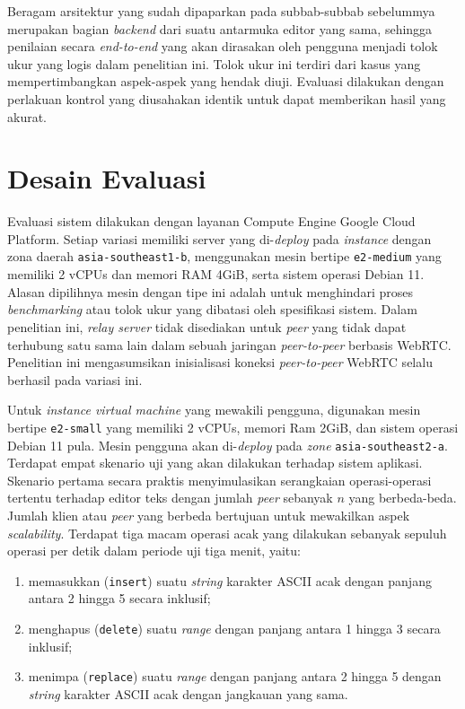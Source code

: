 Beragam arsitektur yang sudah dipaparkan pada subbab-subbab sebelummya merupakan bagian \textit{backend} dari suatu antarmuka editor yang sama, sehingga penilaian secara \textit{end-to-end} yang akan dirasakan oleh pengguna menjadi tolok ukur yang logis dalam penelitian ini. Tolok ukur ini terdiri dari kasus yang mempertimbangkan aspek-aspek yang hendak diuji. Evaluasi dilakukan dengan perlakuan kontrol yang diusahakan identik untuk dapat memberikan hasil yang akurat.

\section{Desain Evaluasi}
\label{sec:desain_evaluasi}

Evaluasi sistem dilakukan dengan layanan Compute Engine Google Cloud Platform. Setiap variasi memiliki server yang di-\textit{deploy} pada \textit{instance} dengan zona daerah \texttt{asia-southeast1-b}, menggunakan mesin bertipe \texttt{e2-medium} yang memiliki 2 vCPUs dan memori RAM 4GiB, serta sistem operasi Debian 11. Alasan dipilihnya mesin dengan tipe ini adalah untuk menghindari proses \textit{benchmarking} atau tolok ukur yang dibatasi oleh spesifikasi sistem. Dalam penelitian ini, \textit{relay server} tidak disediakan untuk \textit{peer} yang tidak dapat terhubung satu sama lain dalam sebuah jaringan \textit{peer-to-peer} berbasis WebRTC. Penelitian ini mengasumsikan inisialisasi koneksi \textit{peer-to-peer} WebRTC selalu berhasil pada variasi ini.

Untuk \textit{instance virtual machine} yang mewakili pengguna, digunakan mesin bertipe \texttt{e2-small} yang memiliki 2 vCPUs, memori Ram 2GiB, dan sistem operasi Debian 11 pula. Mesin pengguna akan di-\textit{deploy} pada \textit{zone} \texttt{asia-southeast2-a}. Terdapat empat skenario uji yang akan dilakukan terhadap sistem aplikasi. Skenario pertama secara praktis menyimulasikan serangkaian operasi-operasi tertentu terhadap editor teks dengan jumlah \textit{peer} sebanyak $n$ yang berbeda-beda. Jumlah klien atau \textit{peer} yang berbeda bertujuan untuk mewakilkan aspek \textit{scalability}. Terdapat tiga macam operasi acak yang dilakukan sebanyak sepuluh operasi per detik dalam periode uji tiga menit, yaitu:

\begin{enumerate}[nolistsep]
    \item memasukkan (\texttt{insert}) suatu \textit{string} karakter ASCII acak dengan panjang antara 2 hingga 5 secara inklusif;
    \item menghapus (\texttt{delete}) suatu \textit{range} dengan panjang antara 1 hingga 3 secara inklusif;
    \item menimpa (\texttt{replace}) suatu \textit{range} dengan panjang antara 2 hingga 5 dengan \textit{string} karakter ASCII acak dengan jangkauan yang sama.
\end{enumerate}

